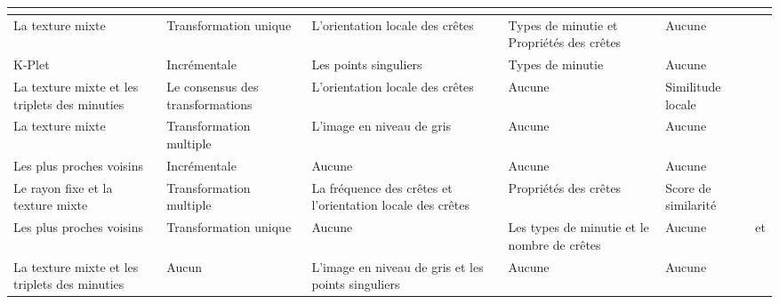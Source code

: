 \begin{sidewaystable}[h!]
\begin{tabular}{|p{4cm}|p{4cm}|p{4cm}|p{3cm}|p{3cm}|p{4cm}|}
\begin{center}
\begin{center}
 \end{center}
\end{center} \\ \hline
 			La texture mixte & Transformation unique & 
 				 L’orientation locale des crêtes
 		  & Types de minutie et Propriétés des crêtes & Aucune & \citep{he2003image} \\ \hline
 			K-Plet & Incrémentale & Les points singuliers & Types de minutie & Aucune & \citep{chikkerur2005impact} \\ \hline
 			La texture mixte et les triplets des minuties & Le consensus des transformations & L’orientation locale des crêtes & Aucune & Similitude locale & \citep{chen2006algorithm} \\ \hline
 			La texture mixte & Transformation multiple & L’image en niveau de gris & Aucune & Aucune & \citep{benhammadi2007fingerprint} \\ \hline
 			Les plus proches voisins & Incrémentale & Aucune & Aucune & Aucune & \citep{Watson2010} \\ \hline
 			Le rayon fixe et la texture mixte & Transformation multiple & La fréquence des crêtes et l’orientation locale des crêtes & Propriétés des crêtes & Score de similarité & \citep{cao2009fingerprint} \\ \hline
 			Les plus proches voisins & Transformation unique & Aucune & Les types de minutie et le nombre de crêtes & Aucune & \citep{jiang2000fingerprint} et \citep{bengueddoudj2013improving} \\ \hline
 			La texture mixte et les triplets des minuties & Aucun & L’image en niveau de gris et les points singuliers & Aucune & Aucune & \citep{mistry2013fusion} \\ \hline
 		\end{tabular}

 \end{sidewaystable}
 \clearpage
